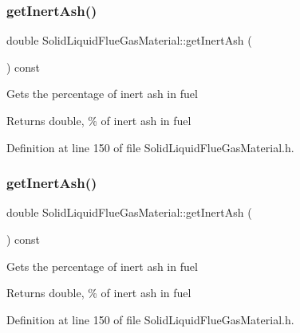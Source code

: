 \subsubsection{\texorpdfstring{get\+Inert\+Ash()}{getInertAsh()}\hspace{0.1cm}{\footnotesize\ttfamily [1/3]}}
{\footnotesize\ttfamily double Solid\+Liquid\+Flue\+Gas\+Material\+::get\+Inert\+Ash (\begin{DoxyParamCaption}{ }\end{DoxyParamCaption}) const\hspace{0.3cm}{\ttfamily [inline]}}

Gets the percentage of inert ash in fuel \begin{DoxyReturn}{Returns}
double, \% of inert ash in fuel 
\end{DoxyReturn}


Definition at line 150 of file Solid\+Liquid\+Flue\+Gas\+Material.\+h.

\mbox{\label{class_solid_liquid_flue_gas_material_a0549b32b7b5423267d5f59cc96b98127}} 
\subsubsection{\texorpdfstring{get\+Inert\+Ash()}{getInertAsh()}\hspace{0.1cm}{\footnotesize\ttfamily [2/3]}}
{\footnotesize\ttfamily double Solid\+Liquid\+Flue\+Gas\+Material\+::get\+Inert\+Ash (\begin{DoxyParamCaption}{ }\end{DoxyParamCaption}) const\hspace{0.3cm}{\ttfamily [inline]}}

Gets the percentage of inert ash in fuel \begin{DoxyReturn}{Returns}
double, \% of inert ash in fuel 
\end{DoxyReturn}


Definition at line 150 of file Solid\+Liquid\+Flue\+Gas\+Material.\+h.

\mbox{\label{class_solid_liquid_flue_gas_material_a0549b32b7b5423267d5f59cc96b98127}} 
